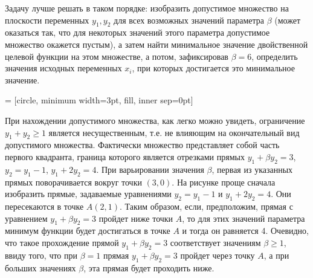 \begin{solution}
Задачу лучше решать в таком порядке: изобразить допустимое множество на плоскости переменных $y_{1} ,y_{2} $ для всех возможных значений параметра $\beta $ (может оказаться так, что для некоторых значений этого параметра допустимое множество окажется пустым), а затем найти минимальное значение двойственной целевой функции на этом множестве, а потом, зафиксировав $\beta =6$, определить значения исходных переменных $x_{i} $, при которых достигается это минимальное значение.


 = [circle, minimum width=3pt, fill, inner sep=0pt]


При нахождении допустимого множества, как легко можно увидеть, ограничение $y_{1} +y_{2} \ge 1$ является несущественным, т.е. не влияющим на окончательный вид допустимого множества. Фактически множество представляет собой часть первого квадранта, граница которого является отрезками прямых $y_{1} +\beta y_{2} =3$, $y_{2} =y_{1} -1$, $y_{1} +2y_{2} =4$. При варьировании значения $\beta $, первая из указанных прямых поворачивается вокруг точки $(3,0)$. На рисунке проще сначала изобразить прямые, задаваемые уравнениями $y_{2} =y_{1} -1$ и $y_{1} +2y_{2} =4$. Они пересекаются в точке $A(2,1)$. Таким образом, если, предположим, прямая с уравнением  $y_{1} +\beta y_{2} =3$ пройдет ниже точки $A$, то для этих значений параметра минимум функции будет достигаться в точке $A$ и тогда он равняется 4. Очевидно, что такое прохождение прямой $y_{1} +\beta y_{2} =3$ соответствует значениям $\beta \ge 1$, ввиду того, что при $\beta =1$ прямая $y_{1} +\beta y_{2} =3$ пройдет через точку $A$, а при больших значениях $\beta $, эта прямая будет проходить ниже.


\end{solution}
